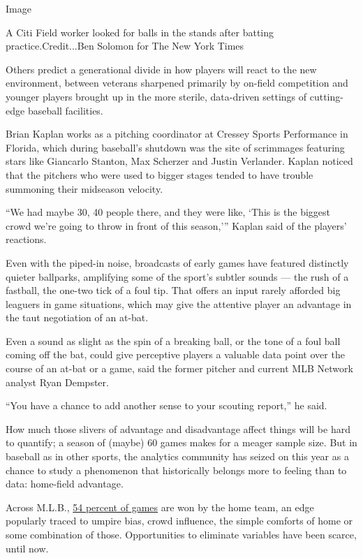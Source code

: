 Image

A Citi Field worker looked for balls in the stands after batting
practice.Credit...Ben Solomon for The New York Times

Others predict a generational divide in how players will react to the
new environment, between veterans sharpened primarily by on-field
competition and younger players brought up in the more sterile,
data-driven settings of cutting-edge baseball facilities.

Brian Kaplan works as a pitching coordinator at Cressey Sports
Performance in Florida, which during baseball's shutdown was the site of
scrimmages featuring stars like Giancarlo Stanton, Max Scherzer and
Justin Verlander. Kaplan noticed that the pitchers who were used to
bigger stages tended to have trouble summoning their midseason velocity.

``We had maybe 30, 40 people there, and they were like, `This is the
biggest crowd we're going to throw in front of this season,''' Kaplan
said of the players' reactions.

Even with the piped-in noise, broadcasts of early games have featured
distinctly quieter ballparks, amplifying some of the sport's subtler
sounds --- the rush of a fastball, the one-two tick of a foul tip. That
offers an input rarely afforded big leaguers in game situations, which
may give the attentive player an advantage in the taut negotiation of an
at-bat.

Even a sound as slight as the spin of a breaking ball, or the tone of a
foul ball coming off the bat, could give perceptive players a valuable
data point over the course of an at-bat or a game, said the former
pitcher and current MLB Network analyst Ryan Dempster.

``You have a chance to add another sense to your scouting report,'' he
said.

How much those slivers of advantage and disadvantage affect things will
be hard to quantify; a season of (maybe) 60 games makes for a meager
sample size. But in baseball as in other sports, the analytics community
has seized on this year as a chance to study a phenomenon that
historically belongs more to feeling than to data: home-field advantage.

Across M.L.B.,
\href{https://fivethirtyeight.com/features/a-home-playoff-game-is-a-big-advantage-unless-you-play-hockey/}{54
percent of games} are won by the home team, an edge popularly traced to
umpire bias, crowd influence, the simple comforts of home or some
combination of those. Opportunities to eliminate variables have been
scarce, until now.

